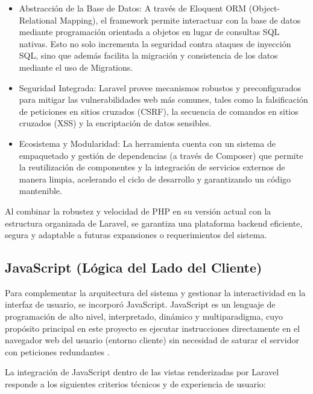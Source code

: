 \begin{itemize}
	\item Abstracción de la Base de Datos: A través de Eloquent ORM
		(Object-Relational Mapping), el framework permite interactuar
		con la base de datos mediante programación orientada a objetos
		en lugar de consultas SQL nativas. Esto no solo incrementa la
		seguridad contra ataques de inyección SQL, sino que además
		facilita la migración y consistencia de los datos mediante el
		uso de Migrations.

	\item Seguridad Integrada: Laravel provee mecanismos robustos
		y preconfigurados para mitigar las vulnerabilidades web más
		comunes, tales como la falsificación de peticiones en sitios
		cruzados (CSRF), la secuencia de comandos en sitios cruzados
		(XSS) y la encriptación de datos sensibles.

	\item Ecosistema y Modularidad: La herramienta cuenta con un
		sistema de empaquetado y gestión de dependencias (a través de
		Composer) que permite la reutilización de componentes y la
		integración de servicios externos de manera limpia, acelerando
		el ciclo de desarrollo y garantizando un código mantenible.
\end{itemize}

Al combinar la robustez y velocidad de PHP en su versión actual
con la estructura organizada de Laravel, se garantiza una plataforma
backend eficiente, segura y adaptable a futuras expansiones o
requerimientos del sistema.

\subsection{JavaScript (Lógica del Lado del Cliente)}

Para complementar la arquitectura del sistema y gestionar la interactividad
en la interfaz de usuario, se incorporó JavaScript. JavaScript es un
lenguaje de programación de alto nivel, interpretado, dinámico y
multiparadigma, cuyo propósito principal en este proyecto es ejecutar
instrucciones directamente en el navegador web del usuario (entorno cliente)
sin necesidad de saturar el servidor con peticiones redundantes
\parencite{ecma_javascript_2026}.

La integración de JavaScript dentro de las vistas renderizadas por
Laravel responde a los siguientes criterios técnicos y de experiencia
de usuario:


